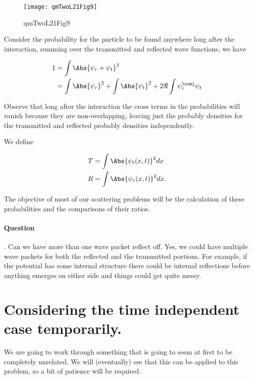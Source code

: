 \begin{figure}[htp]
   \centering
   \texttt{[image: qmTwoL21Fig9]}
   \caption{qmTwoL21Fig9}\label{fig:qmTwoL21:qmTwoL21Fig9}
\end{figure}

Consider the probability for the particle to be found anywhere long after the interaction, summing over the transmitted and reflected wave functions, we have

\begin{align*}
1 
&= \int \Abs{\psi_r + \psi_t}^2 \\
&= \int \Abs{\psi_r}^2  + \int \Abs{\psi_t}^2 + 2 \Re \int \psi_r^\conj \psi_t
\end{align*}

Observe that long after the interaction the cross terms in the probabilities will vanish because they are non-overlapping, leaving just the probably densities for the transmitted and reflected probably densities independently.

We define 

\begin{align}\label{eqn:qmTwoL21:410}
T &= \int \Abs{\psi_t(x, t)}^2 dx \\
R &= \int \Abs{\psi_r(x, t)}^2 dx.
\end{align}

The objective of most of our scattering problems will be the calculation of these probabilities and the comparisons of their ratios.

\paragraph{Question}.  Can we have more than one wave packet reflect off.  Yes, we could have multiple wave packets for both the reflected and the transmitted portions.  For example, if the potential has some internal structure there could be internal reflections before anything emerges on either side and things could get quite messy.

\section{Considering the time independent case temporarily.}

We are going to work through something that is going to seem at first to be completely unrelated.  We will (eventually) see that this can be applied to this problem, so a bit of patience will be required.

